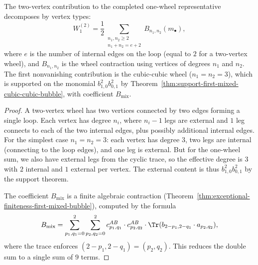 \begin{theorem}
The two-vertex contribution to the completed one-wheel representative decomposes
by vertex types:
\begin{equation}
W_1^{(2)}
= \frac{1}{2} \sum_{\substack{n_1, n_2 \geq 2 \\ n_1 + n_2 = e + 2}}
B_{n_1,n_2}(m_\bullet),
\end{equation}
where $e$ is the number of internal edges on the loop (equal to $2$ for a two-vertex
wheel), and $B_{n_1,n_2}$ is the wheel contraction using vertices of degrees $n_1$ and
$n_2$. The first nonvanishing contribution is the cubic-cubic wheel ($n_1 = n_2 = 3$),
which is supported on the monomial $b_{1,0}^2 b_{0,1}^2$ by
Theorem~\ref{thm:support-first-mixed-cubic-cubic-bubble}, with coefficient
$B_{\mathrm{mix}}$.
\end{theorem}

\begin{proof}
A two-vertex wheel has two vertices connected by two edges forming a single loop.
Each vertex has degree $n_i$, where $n_i - 1$ legs are external and $1$ leg connects
to each of the two internal edges, plus possibly additional internal edges. For
the simplest case $n_1 = n_2 = 3$: each vertex has degree $3$, two legs are internal
(connecting to the loop edges), and one leg is external. But for the one-wheel sum,
we also have external legs from the cyclic trace, so the effective degree is $3$ with
$2$ internal and $1$ external per vertex. The external content is thus
$b_{1,0}^2 b_{0,1}^2$ by the support theorem.

The coefficient $B_{\mathrm{mix}}$ is a finite algebraic contraction
(Theorem~\ref{thm:exceptional-finiteness-first-mixed-bubble}), computed by the
formula
\[
B_{\mathrm{mix}} = \sum_{p_1,q_1=0}^{2} \sum_{p_2,q_2=0}^{2}
c^{AB}_{p_1,q_1} \cdot c^{AB}_{p_2,q_2} \cdot
\Tr(b_{2-p_1,2-q_1} \cdot a_{p_2,q_2}),
\]
where the trace enforces $(2-p_1, 2-q_1) = (p_2, q_2)$. This reduces the double sum
to a single sum of $9$ terms.
\end{proof}

